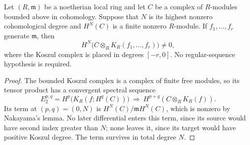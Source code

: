 \begin{lemma}\label{ext:koszul}
 Let $(R,\mathfrak m)$ be a noetherian local ring and let $C$ be a
 complex of $R$-modules bounded above in cohomology.  Suppose that
 $N$ is its highest nonzero cohomological degree and $H^N(C)$ is a
 finite nonzero $R$-module.  If $f_1,\ldots,f_r$ generate
 $\mathfrak m$, then
 \[
 H^N\bigl(C\otimes_R K_R(f_1,\ldots,f_r)\bigr)\ne0,
 \]
 where the Koszul complex is placed in degrees $[-r,0]$.
 No regular-sequence hypothesis is required.
\end{lemma}

\begin{proof}
 The bounded Koszul complex is a complex of finite free modules, so its
 tensor product has a convergent spectral sequence
 \[
 E_2^{p,q}=H^p\bigl(K_R(f;H^q(C))\bigr)
       \ \Longrightarrow\ H^{p+q}(C\otimes_R K_R(f)).
 \]
 Its term at $(p,q)=(0,N)$ is
 $H^N(C)/\mathfrak mH^N(C)$, which is nonzero by Nakayama's lemma.
 No later differential enters this term, since its source would have
 second index greater than $N$; none leaves it, since its target
 would have positive Koszul degree.  The term survives in total
 degree $N$.
\end{proof}

